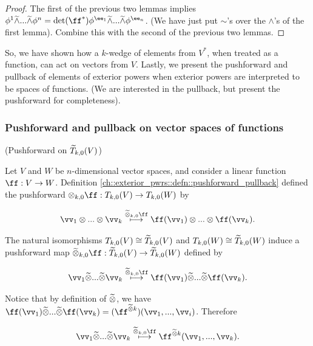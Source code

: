 \begin{proof}
   The first of the previous two lemmas implies $\phi^1 \twedge ... \twedge \phi^n = \det(\ff^*) \phi^{\ee_1} \twedge ... \twedge \phi^{\ee_n}$. (We have just put $\sim$'s over the $\wedge$'s of the first lemma). Combine this with the second of the previous two lemmas.
\end{proof}

So, we have shown how a $k$-wedge of elements from $V^*$, when treated as a function, can act on vectors from $V$. Lastly, we present the pushforward and pullback of elements of exterior powers when exterior powers are interpreted to be spaces of functions. (We are interested in the pullback, but present the pushforward for completeness).

\subsubsection{Pushforward and pullback on vector spaces of functions}

\begin{deriv}
    (Pushforward on $\widetilde{T}_{k,0}(V)$)
    
    Let $V$ and $W$ be $n$-dimensional vector spaces, and consider a linear function $\ff:V \rightarrow W$. Definition \ref{ch::exterior_pwrs::defn::pushforward_pullback} defined the pushforward $\otimes_{k, 0} \ff: T_{k,0}(V) \rightarrow T_{k,0}(W)$ by
    
    \begin{align*}
        \vv_1 \otimes ... \otimes \vv_k \overset{\totimes_{k,0} \ff}{\longmapsto} \ff(\vv_1) \otimes ... \otimes \ff(\vv_k).
    \end{align*}
    
    The natural isomorphisms $T_{k,0}(V) \cong \widetilde{T}_{k,0}(V)$ and $T_{k,0}(W) \cong \widetilde{T}_{k,0}(W)$ induce a pushforward map ${\totimes_{k,0} \ff:\tT_{k,0}(V) \rightarrow \tT_{k,0}(W)}$ defined by
    
    \begin{align*}
        \vv_1 \totimes ... \totimes \vv_k \overset{\totimes_{k,0} \ff}{\longmapsto} \ff(\vv_1) \totimes ... \totimes \ff(\vv_k).
    \end{align*}
    
    Notice that by definition of $\widetilde{\otimes}$, we have $ \ff(\vv_1) \totimes ... \totimes \ff(\vv_k) = (\ff^{\totimes k})(\vv_1, ..., \vv_i)$. Therefore
    
    \begin{align*}
        \vv_1 \totimes ... \totimes \vv_k \overset{\totimes_{k,0} \ff}{\longmapsto} \ff^{\totimes k}(\vv_1, ..., \vv_k).
    \end{align*}
\end{deriv}

